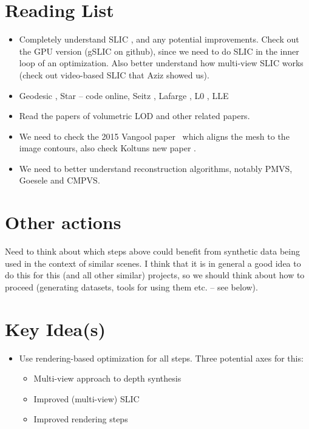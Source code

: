 \documentclass{article}
\begin{document}
\section{Reading List}
\begin{itemize}
\item Completely understand SLIC \cite{slic12}, and any potential improvements. Check out the GPU version (gSLIC on github), since we need to do SLIC in the inner loop of an optimization. Also better understand how multi-view SLIC works (check out video-based SLIC that Aziz showed us).
\item Geodesic \cite{criminisi2010geodesic}, Star \cite{gulshan2010geodesic} -- code online, Seitz \cite{shan2014occluding} , Lafarge \cite{lafarge2013hybrid}, L0 \cite{xu2011image}, LLE \cite{chen2012manifold} 
\item Read the papers of volumetric LOD \cite{bruneton2012real,crassin2009gigavoxels} and other related papers.
\item We need to check the 2015 Vangool paper~\cite{bodis2015superpixel} which aligns the mesh to the image
contours, also check Koltuns new paper \cite{vlad15}.
\item We need to better understand reconstruction algorithms, notably PMVS, Goesele and CMPVS.
\end{itemize}

\section{Other actions}

Need to think about which steps above could benefit from synthetic data being used in the context of similar scenes. I think that it is in general a good idea to do this for this (and all other similar) projects, so we should think about how to proceed (generating datasets, tools for using them etc. -- see below).


\section{Key Idea(s)}
\begin{itemize}
\item Use rendering-based optimization for all steps. Three potential axes for this:
\begin{itemize}
\item Multi-view approach to depth synthesis
\item Improved (multi-view) SLIC
\item Improved rendering steps
\end{itemize}
\end{itemize}
\end{document}
